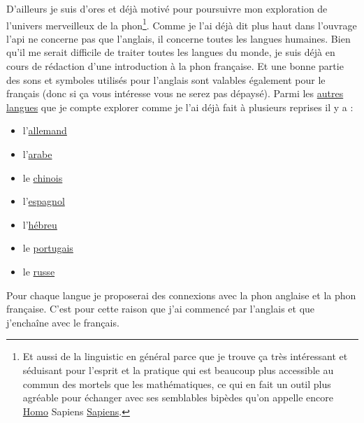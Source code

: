 D'ailleurs je suis d'ores et déjà motivé pour poursuivre mon
exploration de l'univers merveilleux de la \gls{phon}\footnote{Et
  aussi de la \gls{linguistic} en général parce que je trouve ça très
  intéressant et séduisant pour l'esprit et la pratique qui est
  beaucoup plus accessible au commun des mortels que les
  mathématiques, ce qui en fait un outil plus agréable pour échanger
  avec ses semblables bipèdes qu'on appelle encore \href{https://youtu.be/dGiQaabX3_o}{Homo} Sapiens
  \href{https://youtu.be/npfShBTNp3Q}{Sapiens}.}. Comme je l'ai déjà dit plus haut dans l'ouvrage l'\acrshort{api} ne
concerne pas que l'anglais, il concerne toutes les langues
humaines. Bien qu'il me serait difficile de traiter toutes les langues
du monde, je suis déjà en cours de rédaction d'une introduction à la
\gls{phon} française. Et une bonne partie des sons et symboles
utilisés pour l'anglais sont valables également pour le
français (donc si ça vous intéresse vous ne serez pas dépaysé). Parmi les \href{https://www.youtube.com/playlist?list=PLfKvL-VUSKAnkBk88BAb3oq1MlGVnhwcY}{autres
  langues} que je compte explorer comme je l'ai déjà fait à plusieurs
reprises il y a :
\begin{itemize}
  \item  l'\href{https://www.youtube.com/playlist?list=PLfKvL-VUSKAnM9MWJT9F1z1QZTdb73i7r}{allemand}
  \item
    l'\href{https://www.youtube.com/playlist?list=PLfKvL-VUSKAkXu2x3Fp74QxxYUVP43haA}{arabe}
  \item le
    \href{https://www.youtube.com/playlist?list=PLfKvL-VUSKAl4R0Mh7sKvQjqCsiEEa6D9}{chinois}
  \item
    l'\href{https://www.youtube.com/playlist?list=PLfKvL-VUSKAm_p6ikI_pTbxNuHco73REt}{espagnol}
  \item
    l'\href{https://www.youtube.com/playlist?list=PLfKvL-VUSKAkbDhpbtXc7RdroMBBeTJx0}{hébreu}
  \item le
    \href{https://www.youtube.com/playlist?list=PLfKvL-VUSKAn0zUUPYsMDd8_1J_UtfRxh}{portugais}
  \item le \href{https://www.youtube.com/playlist?list=PLfKvL-VUSKAk0YrJ3rV6cBj-w6rNCeOJB}{russe}
  \end{itemize}

Pour chaque langue je proposerai des connexions avec la \gls{phon}
anglaise et la \gls{phon} française. C'est pour cette raison que j'ai
commencé par l'anglais et que j'enchaîne avec le français.

